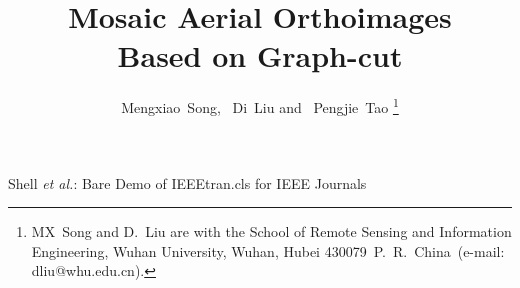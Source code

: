 \documentclass[journal]{IEEEtran}
\begin{document}
%
\title{Mosaic Aerial Orthoimages\\ Based on Graph-cut}
%
%
%

\author{Mengxiao~Song, ~Di~Liu and ~Pengjie~Tao%
\thanks{MX~Song and D.~Liu are with the School of Remote Sensing and Information Engineering, Wuhan University, Wuhan, Hubei 430079~P.~R.~China~(e-mail: dliu@whu.edu.cn).}%
}

%
%



%
{Shell \MakeLowercase{\textit{et al.}}: Bare Demo of IEEEtran.cls for IEEE Journals}
%
\end{document}
